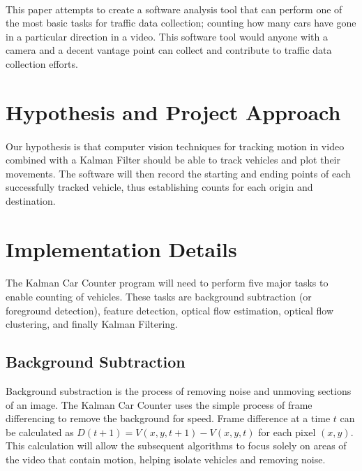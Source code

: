 \documentclass{article} %
\begin{document}
\paragraph{} This paper attempts to create a software analysis tool that can perform one of the most basic tasks for traffic data collection; counting how many cars have gone in a particular direction in a video. This software tool would anyone with a camera and a decent vantage point can collect and contribute to traffic data collection efforts. 

\section{Hypothesis and Project Approach}
\label{headings}
\paragraph{}Our hypothesis is that computer vision techniques for tracking motion in video combined with a Kalman Filter should be able to track vehicles and plot their movements. The software will then record the starting and ending points of each successfully tracked vehicle, thus establishing counts for each origin and destination.


\section{Implementation Details}
\label{headings}
\paragraph{}The Kalman Car Counter program will need to perform five major tasks to enable counting of vehicles. These tasks are background subtraction (or foreground detection), feature detection, optical flow estimation, optical flow clustering, and finally Kalman Filtering.
\subsection{Background Subtraction}
Background substraction is the process of removing noise and unmoving sections of an image.  The Kalman Car Counter uses the simple process of frame differencing to remove the background for speed. Frame difference at a time $t$ can be calculated as 
$ D(t+1) = V(x,y,t+1) - V(x,y,t) $ for each pixel $(x,y)$. \cite{Birgi09}
This calculation will allow the subsequent algorithms to focus solely on areas of the video that contain motion, helping isolate vehicles and removing noise.
\end{document}
